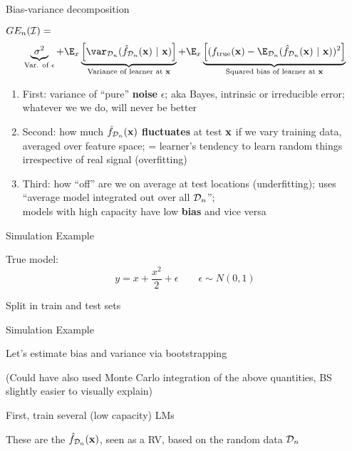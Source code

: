 \documentclass[11pt,compress,t,notes=noshow, xcolor=table]{beamer}
\begin{document}
\begin{frame}{Bias-variance decomposition}


$GE_n(\mathcal{I}) =$  
$$
\underbrace{\sigma^2}_{\text{Var. of $\epsilon$}} + \E_{x}\underbrace{\left[\var_{\D_n}(\fh_{\D_n}(\xv) ~|~\xv)\right]}_{\text{Variance of learner at } \xv} + \E_{x}\underbrace{\left[(\ftrue(\xv)-\E_{\D_n}(\fh_{\D_n}(\xv)~|~\xv))^2\right]}_{\text{Squared bias of learner at } \xv}  
$$

\begin{enumerate}
\item First: variance of ``pure''
\textbf{noise} $\epsilon$; aka Bayes, intrinsic or irreducible error; 
whatever we we do, will never be better
\item Second: how much \textbf{$\hat{f}_{\mathcal{D}_n}(\mathbf{x})$ fluctuates} at test $\mathbf{x}$ if we vary training data, averaged over feature space; = learner's tendency to learn random things irrespective of real signal (overfitting)

\item Third: how ``off'' are we on average at test locations (underfitting); uses ``average model integrated out over all $\mathcal{D}_n$''; \\
models with high capacity have low \textbf{bias} and vice versa
\end{enumerate}


\end{frame} 

\begin{framei}[sep=L]{Simulation Example}

\item True model:
$$y = x + \frac{x^2}{2} + \epsilon  \qquad \epsilon \sim 
N (0, 1)$$
\item Split in train and test sets 


\end{framei} 


\begin{framei}[sep=M]{Simulation Example}

\item Let's estimate bias and variance via bootstrapping

\item (Could have also used Monte Carlo integration of the above quantities,
BS slightly easier to visually explain)

\item First, train several (low capacity) LMs
\item These are the $\hat{f}_{\mathcal{D}_n}(\mathbf{x})$, seen as a RV, based on the random
data $\mathcal{D}_n$

\splitVCC
{}
{}

\end{framei} 
\end{document}
